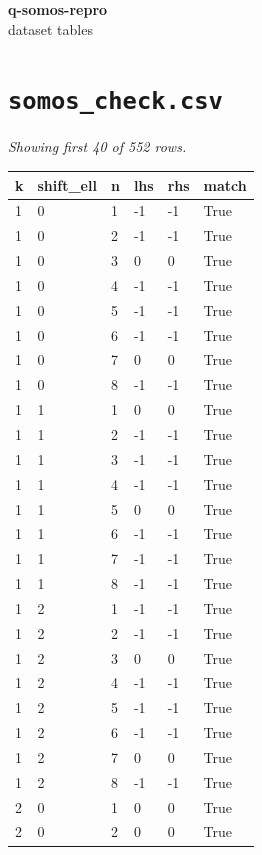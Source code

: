 \documentclass[10pt]{article}
\begin{document}
\begin{center}\Large\textbf{q-somos-repro} \\ \normalsize dataset tables\end{center}
\vspace{1em}
\section*{\texttt{somos\_check.csv}}
\noindent\textit{Showing first 40 of 552 rows.}\par\medskip
{\footnotesize
\begin{longtable}{@{}llllll@{}}
\toprule
\textbf{k} & \textbf{shift\_ell} & \textbf{n} & \textbf{lhs} & \textbf{rhs} & \textbf{match} \\
\midrule\endhead
1 & 0 & 1 & -1 & -1 & True \\
1 & 0 & 2 & -1 & -1 & True \\
1 & 0 & 3 & 0 & 0 & True \\
1 & 0 & 4 & -1 & -1 & True \\
1 & 0 & 5 & -1 & -1 & True \\
1 & 0 & 6 & -1 & -1 & True \\
1 & 0 & 7 & 0 & 0 & True \\
1 & 0 & 8 & -1 & -1 & True \\
1 & 1 & 1 & 0 & 0 & True \\
1 & 1 & 2 & -1 & -1 & True \\
1 & 1 & 3 & -1 & -1 & True \\
1 & 1 & 4 & -1 & -1 & True \\
1 & 1 & 5 & 0 & 0 & True \\
1 & 1 & 6 & -1 & -1 & True \\
1 & 1 & 7 & -1 & -1 & True \\
1 & 1 & 8 & -1 & -1 & True \\
1 & 2 & 1 & -1 & -1 & True \\
1 & 2 & 2 & -1 & -1 & True \\
1 & 2 & 3 & 0 & 0 & True \\
1 & 2 & 4 & -1 & -1 & True \\
1 & 2 & 5 & -1 & -1 & True \\
1 & 2 & 6 & -1 & -1 & True \\
1 & 2 & 7 & 0 & 0 & True \\
1 & 2 & 8 & -1 & -1 & True \\
2 & 0 & 1 & 0 & 0 & True \\
2 & 0 & 2 & 0 & 0 & True \\

\end{longtable}}
\end{document}
